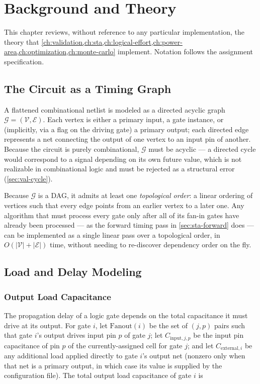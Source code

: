 \chapter{Background and Theory}
\label{ch:background}

This chapter reviews, without reference to any particular implementation,
the theory that \cref{ch:validation,ch:sta,ch:logical-effort,ch:power-area,ch:optimization,ch:monte-carlo}
implement. Notation follows the assignment specification.

\section{The Circuit as a Timing Graph}
\label{sec:bg-graph}

A flattened combinational netlist is modeled as a directed acyclic graph
$\mathcal{G} = (\mathcal{V}, \mathcal{E})$. Each vertex is either a primary
input, a gate instance, or (implicitly, via a flag on the driving gate) a
primary output; each directed edge represents a net connecting the output of
one vertex to an input pin of another. Because the circuit is purely
combinational, $\mathcal{G}$ must be acyclic --- a directed cycle would
correspond to a signal depending on its own future value, which is not
realizable in combinational logic and must be rejected as a structural
error (\cref{sec:val-cycle}).

Because $\mathcal{G}$ is a DAG, it admits at least one \emph{topological
order}: a linear ordering of vertices such that every edge points from an
earlier vertex to a later one. Any algorithm that must process every gate
only after all of its fan-in gates have already been processed --- as the
forward timing pass in \cref{sec:sta-forward} does --- can be implemented as
a single linear pass over a topological order, in $O(|\mathcal{V}| +
|\mathcal{E}|)$ time, without needing to re-discover dependency order on the
fly.

\section{Load and Delay Modeling}
\label{sec:bg-delay}

\subsection{Output Load Capacitance}

The propagation delay of a logic gate depends on the total capacitance it
must drive at its output. For gate $i$, let $\mathrm{Fanout}(i)$ be the set
of $(j,p)$ pairs such that gate $i$'s output drives input pin $p$ of gate
$j$; let $C_{\mathrm{input},j,p}$ be the input pin capacitance of pin $p$ of
the currently-assigned cell for gate $j$; and let $C_{\mathrm{external},i}$
be any additional load applied directly to gate $i$'s output net (nonzero
only when that net is a primary output, in which case its value is supplied
by the configuration file). The total output load capacitance of gate $i$
is

